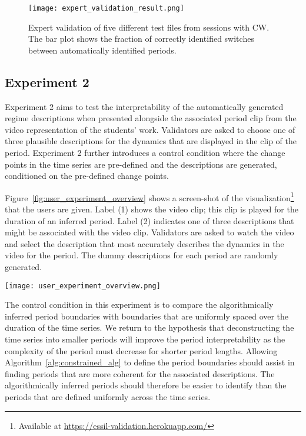 \begin{figure}
\centering
\texttt{[image: expert\_validation\_result.png]}
\caption{Expert validation of five different test files from sessions with CW. The bar plot shows the fraction of correctly identified switches between automatically identified periods.}
\label{fig:results_expert_validation}
\end{figure}

\subsection{Experiment 2}\label{sec:experiment2-empirical-validation}

Experiment 2 aims to test the interpretability of the automatically generated regime descriptions when presented alongside the associated period clip from the video representation of the students' work. Validators are asked to choose one of three plausible descriptions for the dynamics that are displayed in the clip of the period. Experiment 2 further introduces a control condition where the change points in the time series are pre-defined and the descriptions are generated, conditioned on the pre-defined change points.

Figure~\ref{fig:user_experiment_overview} shows a screen-shot of the visualization\footnote{Available at \url{https://essil-validation.herokuapp.com/}} that the users are given. Label (1) shows the video clip; this clip is played for the duration of an inferred period. Label (2) indicates one of three descriptions that might be associated with the video clip. Validators are asked to watch the video and select the description that most accurately describes the dynamics in the video for the period. The dummy descriptions for each period are randomly generated.

\begin{sidewaysfigure}
\texttt{[image: user\_experiment\_overview.png]}
\caption{Screen-shot of the user interface designed to evaluate the interpretability of Algorithm~\ref{alg:constrained_alg}. The video representation at (1) is played for the duration of the period. Three plausible descriptions (of which (2) is one of these) are presented and the validator is asked to select the description that best describes the dynamics shown in the video. In this case, \textit{Description 3} is the correct solution.}
\label{fig:user_experiment_overview}
\end{sidewaysfigure}

The control condition in this experiment is to compare the algorithmically inferred period boundaries with boundaries that are uniformly spaced over the duration of the time series. We return to the hypothesis that deconstructing the time series into smaller periods will improve the period interpretability as the complexity of the period must decrease for shorter period lengths. Allowing Algorithm~\ref{alg:constrained_alg} to define the period boundaries should assist in finding periods that are more coherent for the associated descriptions. The algorithmically inferred periods should therefore be easier to identify than the periods that are defined uniformly across the time series.


